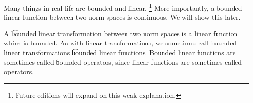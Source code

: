 

Many things in real life are bounded and linear.
  \ifhmode\unskip\fi\footnote{
Future editions will expand on this weak explanation.
  }
More importantly, a bounded linear function between two norm spaces is continuous.
We will show this later.


A \t{bounded linear transformation} between two norm spaces is a linear function which is bounded.
As with linear transformations, we sometimes call bounded linear transformations \t{bounded linear functions}.
Bounded linear functions are sometimes called \t{bounded operators}, since linear functions are sometimes called operators.

\blankpage
